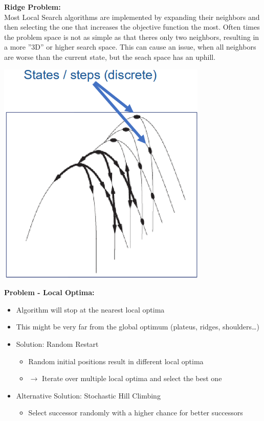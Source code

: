 \documentclass[
../../EiKI_Summary.tex,
]
{subfiles}
\begin{document}
\begin{minipage}
    [centering]{0.6\textwidth}
    \textbf{Ridge Problem:}\\
    Most Local Search algorithms are implemented by expanding their neighbors and then selecting the one that increases the objective function the most. Often times the problem space is not as simple as that theres only two neighbors, resulting in a more ''3D'' or higher search space. This can cause an issue, when all neighbors are worse than the current state, but the seach space has an uphill. 
\end{minipage}
\begin{minipage}
    [c]{0.4\textwidth}
    \centering
    \includegraphics[width=0.75\textwidth]{Pics/04/RidgeProblem.png}
\end{minipage}

\textbf{Problem - Local Optima:}
\begin{itemize}
    \item Algorithm will stop at the nearest local optima
    \item This might be very far from the global optimum (plateus, ridges, shoulders\dots)
    \item Solution: Random Restart
    \begin{itemize}
        \item Random initial positions result in different local optima
        \item $\rightarrow$ Iterate over multiple local optima and select the best one
    \end{itemize}
    \item Alternative Solution: Stochastic Hill Climbing
    \begin{itemize}
        \item Select successor randomly with a higher chance for better successors
    \end{itemize}
\end{itemize}
\end{document}
